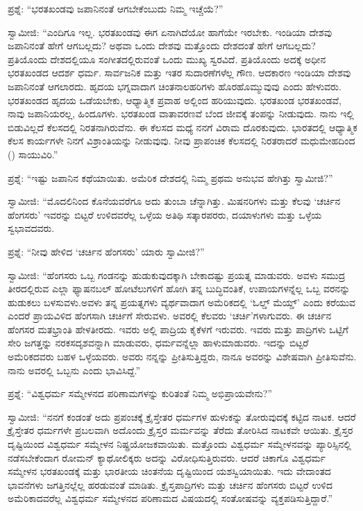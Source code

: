 ಪ್ರಶ್ನೆ: “ಭರತಖಂಡವು ಜಪಾನಿನಂತೆ ಆಗಬೇಕೆಂಬುದು ನಿಮ್ಮ ಇಚ್ಚೆಯೆ?”

ಸ್ವಾಮೀಜಿ: “ಎಂದಿಗೂ ಇಲ್ಲ. ಭರತಖಂಡವು ಈಗ ಏನಾಗಿದೆಯೋ ಹಾಗೆಯೇ ಇರಬೇಕು. ಇಂಡಿಯಾ ದೇಶವು ಜಪಾನಿನಂತೆ ಹೇಗೆ ಆಗಬಲ್ಲದು? ಅಥವಾ ಒಂದು ದೇಶವು ಮತ್ತೊಂದು ದೇಶದಂತೆ ಹೇಗೆ ಆಗಬಲ್ಲದು? ಪ್ರತಿಯೊಂದು ದೇಶದಲ್ಲಿಯೂ ಸಂಗೀತದಲ್ಲಿರುವಂತೆ ಒಂದು ಮುಖ್ಯ ಸ್ವರವಿದೆ. ಪ್ರತಿಯೊಂದು ಅದಕ್ಕೆ ಅಧೀನ ಭರತಖಂಡದ ಆದರ್ಶ ಧರ್ಮ. ಸಾರ್ವಜನಿಕ ಮತ್ತು ಇತರ ಸುದಾರಣೆಗಳೆಲ್ಲ ಗೌಣ. ಆದಕಾರಣ ಇಂಡಿಯಾ ದೇಶವು ಜಪಾನಿನಂತೆ ಆಗಲಾರದು. ಹೃದಯ ಭಗ್ನವಾದಾಗ ಚಿಂತನಾಲಹರಿಗಳು ಹೊರಹೊಮ್ಮುವುವು ಎಂದು ಹೇಳುವರು. ಭರತಖಂಡದ ಹೃದಯ ಒಡೆಯಬೇಕು, ಆಧ್ಯಾತ್ಮಿಕ ಪ್ರವಾಹ ಅಲ್ಲಿಂದ ಹರಿಯುವುದು. ಭರತಖಂಡ ಭರತಖಂಡವೆ, ನಾವು ಜಪಾನಿಯರಲ್ಲ, ಹಿಂದೂಗಳು. ಭರತಖಂಡ ವಾತಾವರಣವೆ ಬೆಂದ ಜೀವಕ್ಕೆ ತಂಪನ್ನು ನೀಡುವುದು. ನಾನು ಇಲ್ಲಿ ಬಿಡುವಿಲ್ಲದೆ ಕೆಲಸದಲ್ಲಿ ನಿರತನಾಗಿರುವೆನು. ಈ ಕೆಲಸದ ಮಧ್ಯೆ ನನಗೆ ವಿರಾಮ ದೊರಕುವುದು. ಭಾರತದಲ್ಲಿ ಆಧ್ಯಾತ್ಮಿಕ ಕೆಲಸ ಕಾರ್ಯಗಳೇ ನಿನಗೆ ವಿಶ್ರಾಂತಿಯನ್ನು ನೀಡುವುವು. ನೀವು ಪ್ರಾಪಂಚಿಕ ಕೆಲಸದಲ್ಲಿ ನಿರತರಾದರೆ ಮಧುಮೇಹದಿಂದ () ಸಾಯುವಿರಿ.”

ಪ್ರಶ್ನೆ: “ಇಷ್ಟು ಜಪಾನಿನ ಕಥೆಯಾಯಿತು. ಅಮೆರಿಕ ದೇಶದಲ್ಲಿ ನಿಮ್ಮ ಪ್ರಥಮ ಅನುಭವ ಹೇಗಿತ್ತು ಸ್ವಾಮೀಜಿ?”

ಸ್ವಾಮೀಜಿ: “ಮೊದಲಿನಿಂದ ಕೊನೆಯವರೆಗೂ ಅದು ತುಂಬಾ ಚೆನ್ನಾಗಿತ್ತು. ಮಿಷನರಿಗಳು ಮತ್ತು ಕೆಲವು ‘ಚರ್ಚಿನ ಹೆಂಗಸರು’ ಇವರನ್ನು ಬಿಟ್ಟರೆ ಉಳಿದವರೆಲ್ಲ ಒಳ್ಳೆಯ ಅತಿಥಿ ಸತ್ಕಾರಪರರು, ದಯಾಳುಗಳು ಮತ್ತು ಒಳ್ಳೆಯ ಸ್ವಭಾವದವರು.

ಪ್ರಶ್ನೆ: “ನೀವು ಹೇಳಿದ ‘ಚರ್ಚಿನ ಹೆಂಗಸರು’ ಯಾರು ಸ್ವಾಮೀಜಿ?”

ಸ್ವಾಮೀಜಿ: “ಹೆಂಗಸರು ಒಬ್ಬ ಗಂಡನನ್ನು ಹುಡುಕುವುದಕ್ಕಾಗಿ ಬೇಕಾದಷ್ಟು ಪ್ರಯತ್ನ ಮಾಡುವರು. ಅವಳು ಸಮುದ್ರ ತೀರದಲ್ಲಿರುವ ಎಲ್ಲಾ ಫ್ಯಾಷನಬಲ್​ ಹೋಟೆಲುಗಳಿಗೆ ಹೋಗಿ ತನ್ನ ಬುದ್ಧಿವಂತಿಕೆ, ಉಪಾಯಗಳನ್ನೆಲ್ಲ ಒಬ್ಬ ವರನನ್ನು ಹುಡುಕಲು ಬಳಸುವಳು.\break ಅವಳು ತನ್ನ ಪ್ರಯತ್ನಗಳು ವ್ಯರ್ಥವಾದಾಗ ಅಮೆರಿಕದಲ್ಲಿ ‘ಓಲ್ಡ್​ ಮೆಯ್ಡ್​’ ಎಂದು ಕರೆಯುವ ಎಂದರೆ ಪ್ರಾಯವಿಳಿದ ಹೆಂಗಸಾಗಿ ಚರ್ಚಿಗೆ ಸೇರುವಳು. ಅವರಲ್ಲಿ ಕೆಲವರು ‘ಚರ್ಚಿ’ಗಳಾಗುವರು. ಈ ಚರ್ಚಿನ ಹೆಂಗಸರ ಮತಭ್ರಾಂತಿ ಹೇಳತೀರದು. ಇವರು ಅಲ್ಲಿ ಪಾದ್ರಿಯ ಕೈಕೆಳಗೆ ಇರುವರು. ಇವರು ಮತ್ತು ಪಾದ್ರಿಗಳು ಒಟ್ಟಿಗೆ ಸೇರಿ ಜಗತ್ತನ್ನು ನರಕಸದೃಶವನ್ನಾಗಿ ಮಾಡುವರು, ಧರ್ಮವನ್ನೆಲ್ಲಾ ಹಾಳುಮಾಡುವರು. ಇದನ್ನು ಬಿಟ್ಟರೆ ಅಮೆರಿಕದವರು ಬಹಳ ಒಳ್ಳೆಯವರು. ಅವರು ನನ್ನನ್ನು ಪ್ರೀತಿಸುತ್ತಿದ್ದರು, ನಾನೂ ಅವರನ್ನು ವಿಶೇಷವಾಗಿ ಪ್ರೀತಿಸುವೆನು. ನಾನು ಅವರಲ್ಲಿ ಒಬ್ಬನು ಎಂದು ಭಾವಿಸಿದ್ದೆ.”

ಪ್ರಶ್ನೆ: “ವಿಶ್ವಧರ್ಮ ಸಮ್ಮೇಳನದ ಪರಿಣಾಮಗಳನ್ನು ಕುರಿತಂತೆ ನಿಮ್ಮ ಅಭಿಪ್ರಾಯವೇನು?”

ಸ್ವಾಮೀಜಿ: “ನನಗೆ ಕಂಡಂತೆ ಅದು ಪ್ರಪಂಚಕ್ಕೆ ಕ್ರೈಸ್ತೇತರ ಧರ್ಮಗಳ ಹುಳುಕನ್ನು ತೋರುವುದಕ್ಕೆ ಕಟ್ಟಿದ ನಾಟಕ. ಆದರೆ ಕ್ರೈಸ್ತೇತರ ಧರ್ಮಗಳೇ ಪ್ರಬಲವಾಗಿ ಅದೊಂದು ಕ್ರೈಸ್ತರ ಮರ್ಮವನ್ನು ತೆರೆದು ತೋರಿಸಿದ ನಾಟಕವೇ ಆಯಿತು. ಕ್ರೈಸ್ತರ ದೃಷ್ಟಿಯಿಂದ ವಿಶ್ವಧರ್ಮ ಸಮ್ಮೇಳನ ನಿಷ್ಪ್ರಯೋಜಕವಾಯಿತು. ಮತ್ತೊಂದು ವಿಶ್ವಧರ್ಮ ಸಮ್ಮೇಳನವನ್ನು ಪ್ಯಾರಿಸ್ಸಿನಲ್ಲಿ ನಡೆಸಬೇಕೆಂದಾಗ ರೋಮನ್​ ಕ್ಯಾಥೋಲಿಕ್ಕರು ಅದನ್ನು ವಿರೋಧಿಸುತ್ತಿರುವರು. ಆದರೆ ಚಿಕಾಗೊ ವಿಶ್ವಧರ್ಮ ಸಮ್ಮೇಳನ ಭರತಖಂಡಕ್ಕೆ ಮತ್ತು ಭಾರತೀಯ ಚಿಂತನೆಯ ದೃಷ್ಟಿಯಿಂದ ಯಶಸ್ವಿಯಾಯಿತು. ಇದು ವೇದಾಂತದ ಭಾವನೆಗಳು ಜಗತ್ತಿನಲ್ಲೆಲ್ಲ ಹರಡುವಂತೆ ಮಾಡಿತು. ಕ್ರೈಸ್ತಪಾದ್ರಿಗಳು ಮತ್ತು ಚರ್ಚಿನ ಹೆಂಗಸರು ಬಿಟ್ಟರೆ ಉಳಿದ ಅಮೆರಿಕಾದವರೆಲ್ಲ ವಿಶ್ವಧರ್ಮ ಸಮ್ಮೇಳನದ ಪರಿಣಾಮದ ವಿಷಯದಲ್ಲಿ ಸಂತೋಷವನ್ನು ವ್ಯಕ್ತಪಡಿಸುತ್ತಿದ್ದಾರೆ.”

